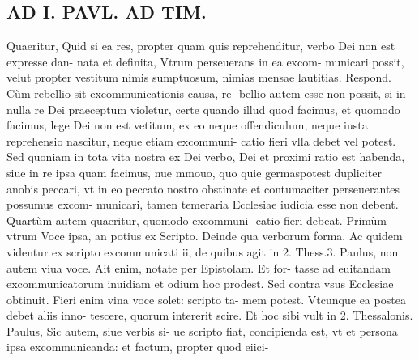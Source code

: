 \documentclass{article}
\begin{document}
\begin{pages}
\section*{AD I. PAVL. AD TIM. }
\marginpar{[ p.J8. ]}\pstart Quaeritur, Quid si ea res, propter quam quis reprehenditur, verbo Dei non est expresse dan- nata et definita, Vtrum perseuerans in ea excom- municari possit, velut propter vestitum nimis sumptuosum, nimias mensae lautitias. Respond. Cùm rebellio sit excommunicationis causa, re- bellio autem esse non possit, si in nulla re Dei praeceptum violetur, certe quando illud quod facimus, et quomodo facimus, lege Dei non est vetitum, ex eo neque offendiculum, neque iusta reprehensio nascitur, neque etiam excommuni- catio fieri vlla debet vel potest. Sed quoniam in tota vita nostra ex Dei verbo, Dei et proximi ratio est habenda, siue in re ipsa quam facimus, nue mmouo, quo quie germaspotest dupliciter anobis peccari, vt in eo peccato nostro obstinate et contumaciter perseuerantes possumus excom- municari, tamen temeraria Ecclesiae iudicia esse non debent.  \pend\pstart Quartùm autem quaeritur, quomodo excommuni- catio fieri debeat. Primùm vtrum Voce ipsa, an potius ex Scripto. Deinde qua verborum forma. Ac quidem videntur ex scripto excommunicati ii, de quibus agit in 2. Thess.3. Paulus, non autem viua voce. Ait enim, notate per Epistolam. Et for- tasse ad euitandam excommunicatorum inuidiam et odium hoc prodest. Sed contra vsus Ecclesiae obtinuit. Fieri enim vina voce solet: scripto ta- mem potest. Vtcunque ea postea debet aliis inno- tescere, quorum intererit scire. Et hoc sibi vult in 2. Thessalonis. Paulus, Sic autem, siue verbis si- ue scripto fiat, concipienda est, vt et persona ipsa excommunicanda: et factum, propter quod eiici-  \pend

\end{pages}
\end{document}
